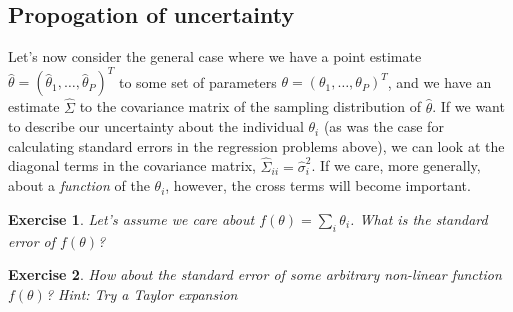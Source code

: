 \documentclass[twoside]{article}
\newcounter{lecnum}
\newtheorem{exercise}{Exercise}[lecnum]
\begin{document}
\subsection{Propogation of uncertainty}
Let's now consider the general case where we have a point estimate $\hat{\theta} = (\hat{\theta}_1,\dots, \hat{\theta}_P)^T$ to some set of parameters $\theta = (\theta_1,\dots,\theta_P)^T$, and we have an estimate $\hat{\Sigma}$ to the covariance matrix of the sampling distribution of $\hat{\theta}$. If we want to describe our uncertainty about the individual $\theta_i$ (as was the case for calculating standard errors in the regression problems above), we can look at the diagonal terms in the covariance matrix, $\hat{\Sigma}_{ii} = \hat{\sigma}_i^2$. If we care, more generally, about a \textit{function} of the $\theta_i$, however, the cross terms will become important.

\begin{exercise}
  Let's assume we care about $f(\theta) = \sum_i \theta_i$. What is the standard error of $f(\theta)$?
\end{exercise}

\begin{exercise}
  How about the standard error of some arbitrary non-linear function $f(\theta)$? \textit{Hint: Try a Taylor expansion}
\end{exercise}
\end{document}
